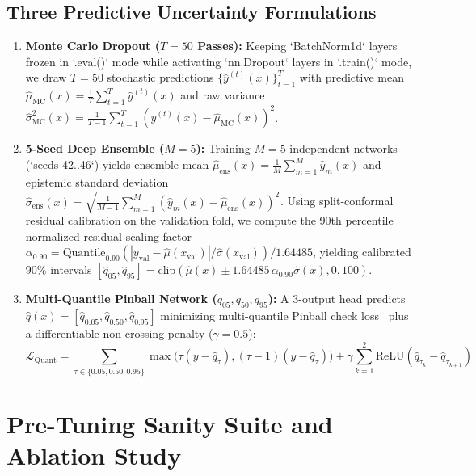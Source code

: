 \documentclass[journal,10pt,twocolumn]{IEEEtran}
\begin{document}
\subsection{Three Predictive Uncertainty Formulations}
\begin{enumerate}
    \item \textbf{Monte Carlo Dropout ($T=50$ Passes):} Keeping `BatchNorm1d` layers frozen in `.eval()` mode while activating `nn.Dropout` layers in `.train()` mode, we draw $T=50$ stochastic predictions $\{\hat{y}^{(t)}(x)\}_{t=1}^{T}$ with predictive mean $\hat{\mu}_{\text{MC}}(x) = \frac{1}{T}\sum_{t=1}^T \hat{y}^{(t)}(x)$ and raw variance $\hat{\sigma}_{\text{MC}}^2(x) = \frac{1}{T-1}\sum_{t=1}^T (\hat{y}^{(t)}(x) - \hat{\mu}_{\text{MC}}(x))^2$.
    \item \textbf{5-Seed Deep Ensemble ($M=5$):} Training $M=5$ independent networks (`seeds 42..46`) yields ensemble mean $\hat{\mu}_{\text{ens}}(x) = \frac{1}{M}\sum_{m=1}^M \hat{y}_m(x)$ and epistemic standard deviation $\hat{\sigma}_{\text{ens}}(x) = \sqrt{\frac{1}{M-1}\sum_{m=1}^M (\hat{y}_m(x) - \hat{\mu}_{\text{ens}}(x))^2}$. Using split-conformal residual calibration on the validation fold, we compute the 90th percentile normalized residual scaling factor $\alpha_{0.90} = \text{Quantile}_{0.90}\!\left(|y_{\text{val}} - \hat{\mu}(x_{\text{val}})| / \hat{\sigma}(x_{\text{val}})\right) / 1.64485$, yielding calibrated $90\%$ intervals $[\hat{q}_{05}, \hat{q}_{95}] = \text{clip}(\hat{\mu}(x) \pm 1.64485\,\alpha_{0.90}\hat{\sigma}(x), 0, 100)$.
    \item \textbf{Multi-Quantile Pinball Network ($q_{05}, q_{50}, q_{95}$):} A 3-output head predicts $\hat{q}(x) = [\hat{q}_{0.05}, \hat{q}_{0.50}, \hat{q}_{0.95}]$ minimizing multi-quantile Pinball check loss~\cite{koenker1978regression} plus a differentiable non-crossing penalty ($\gamma = 0.5$):
    \begin{equation}
        \mathcal{L}_{\text{Quant}} = \sum_{\tau \in \{0.05, 0.50, 0.95\}} \!\!\max\!\big(\tau(y - \hat{q}_\tau), (\tau - 1)(y - \hat{q}_\tau)\big) + \gamma\sum_{k=1}^2 \text{ReLU}(\hat{q}_{\tau_k} - \hat{q}_{\tau_{k+1}})
    \end{equation}
\end{enumerate}

\section{Pre-Tuning Sanity Suite and Ablation Study}
\end{document}
